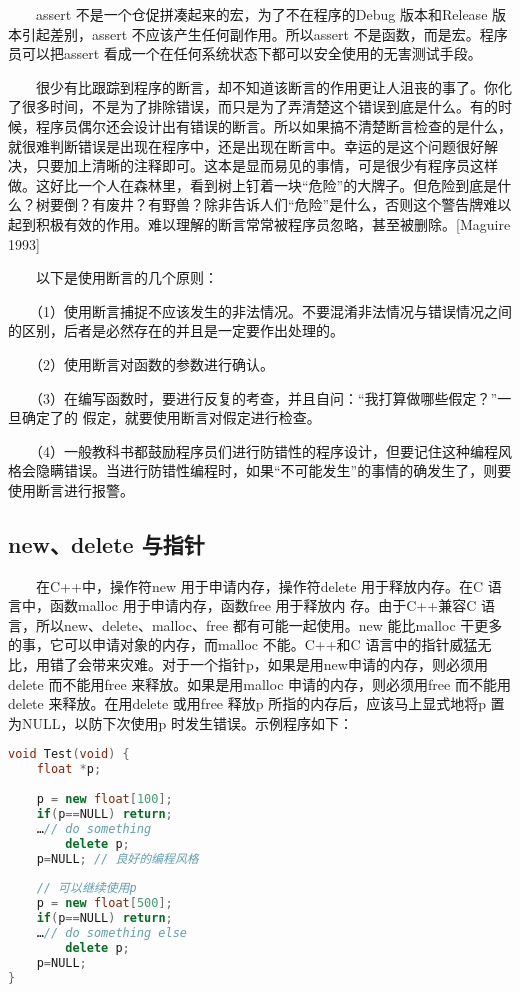 \documentclass[11pt]{article}
\begin{document}
　　assert 不是一个仓促拼凑起来的宏，为了不在程序的Debug 版本和Release 版本引起差别，assert 不应该产生任何副作用。所以assert 不是函数，而是宏。程序员可以把assert 看成一个在任何系统状态下都可以安全使用的无害测试手段。

　　很少有比跟踪到程序的断言，却不知道该断言的作用更让人沮丧的事了。你化了很多时间，不是为了排除错误，而只是为了弄清楚这个错误到底是什么。有的时候，程序员偶尔还会设计出有错误的断言。所以如果搞不清楚断言检查的是什么，就很难判断错误是出现在程序中，还是出现在断言中。幸运的是这个问题很好解决，只要加上清晰的注释即可。这本是显而易见的事情，可是很少有程序员这样做。这好比一个人在森林里，看到树上钉着一块“危险”的大牌子。但危险到底是什么？树要倒？有废井？有野兽？除非告诉人们“危险”是什么，否则这个警告牌难以起到积极有效的作用。难以理解的断言常常被程序员忽略，甚至被删除。[Maguire 1993]

　　以下是使用断言的几个原则：

　　（1）使用断言捕捉不应该发生的非法情况。不要混淆非法情况与错误情况之间的区别，后者是必然存在的并且是一定要作出处理的。

　　（2）使用断言对函数的参数进行确认。

　　（3）在编写函数时，要进行反复的考查，并且自问：“我打算做哪些假定？”一旦确定了的
假定，就要使用断言对假定进行检查。

　　（4）一般教科书都鼓励程序员们进行防错性的程序设计，但要记住这种编程风格会隐瞒错误。当进行防错性编程时，如果“不可能发生”的事情的确发生了，则要使用断言进行报警。
\subsection{new、delete 与指针}
\label{sec-2-3}

　　在C++中，操作符new 用于申请内存，操作符delete 用于释放内存。在C 语言中，函数malloc 用于申请内存，函数free 用于释放内 存。由于C++兼容C 语言，所以new、delete、malloc、free 都有可能一起使用。new 能比malloc 干更多的事，它可以申请对象的内存，而malloc 不能。C++和C 语言中的指针威猛无比，用错了会带来灾难。对于一个指针p，如果是用new申请的内存，则必须用delete 而不能用free 来释放。如果是用malloc 申请的内存，则必须用free 而不能用delete 来释放。在用delete 或用free 释放p 所指的内存后，应该马上显式地将p 置为NULL，以防下次使用p 时发生错误。示例程序如下：
\begin{lstlisting}[language=c++]
void Test(void) {
    float *p;
    
    p = new float[100];
    if(p==NULL) return;
    …// do something
        delete p;
    p=NULL; // 良好的编程风格
    
    // 可以继续使用p
    p = new float[500];
    if(p==NULL) return;
    …// do something else
        delete p;
    p=NULL;
}
\end{lstlisting}
\end{document}
